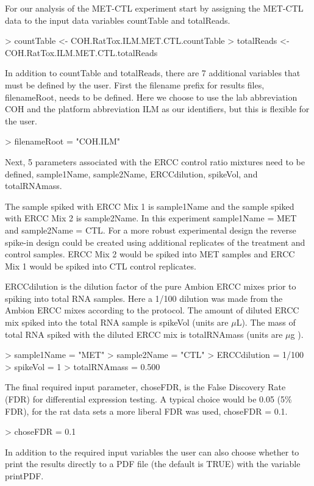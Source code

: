 \documentclass{article}
\begin{document}
For our analysis of the MET-CTL experiment start by assigning the MET-CTL data 
to the input data variables countTable and totalReads.
\begin{Schunk}
\begin{Sinput}
> countTable <- COH.RatTox.ILM.MET.CTL.countTable
> totalReads <- COH.RatTox.ILM.MET.CTL.totalReads
\end{Sinput}
\end{Schunk}
In addition to countTable and totalReads, there are 7 additional variables that
must be defined by the user. First the filename prefix for results files, 
filenameRoot, needs to be defined. Here we choose to use the lab abbreviation 
COH and the platform abbreviation ILM as our identifiers, but this is flexible
for the user.
\begin{Schunk}
\begin{Sinput}
> filenameRoot = "COH.ILM"
\end{Sinput}
\end{Schunk}
Next, 5 parameters associated with the ERCC control ratio mixtures need to be
defined, sample1Name, sample2Name, ERCCdilution, spikeVol, and totalRNAmass.

The sample spiked with ERCC Mix 1 is sample1Name and the sample spiked with 
ERCC Mix 2 is sample2Name. In this experiment sample1Name = MET and 
sample2Name = CTL. For a more robust experimental design the reverse spike-in 
design could be created using additional replicates of the treatment and 
control samples. ERCC Mix 2 would be spiked into MET samples and ERCC Mix 1 
would be spiked into CTL control replicates. 

ERCCdilution is the dilution factor of the pure Ambion ERCC mixes prior to 
spiking into total RNA samples. Here a 1/100 dilution was made from the Ambion 
ERCC mixes according to the protocol. The amount of diluted ERCC mix spiked into
the total RNA sample is spikeVol (units are $\mu$L). The mass of total RNA 
spiked with the diluted ERCC mix is totalRNAmass (units are $\mu$g ).
\begin{Schunk}
\begin{Sinput}
> sample1Name = "MET"
> sample2Name = "CTL"
> ERCCdilution = 1/100
> spikeVol = 1
> totalRNAmass = 0.500
\end{Sinput}
\end{Schunk}
The final required input parameter, choseFDR, is the False Discovery Rate (FDR) 
for differential expression testing. A typical choice would be 0.05 (5\% FDR), 
for the rat data sets a more liberal FDR was used, choseFDR = 0.1.
\begin{Schunk}
\begin{Sinput}
> choseFDR = 0.1
\end{Sinput}
\end{Schunk}
In addition to the required input variables the user can also choose whether to 
print the results directly to a PDF file (the default is TRUE) with the variable
printPDF.
\end{document}

